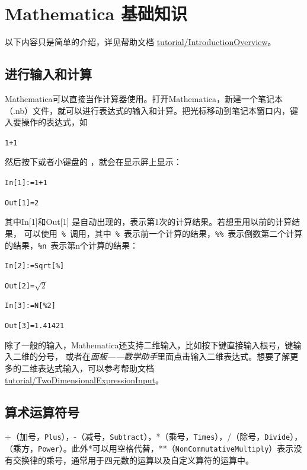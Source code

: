 \documentclass[UTF8,a4paper,10pt]{ctexart}
\begin{document}

\section{Mathematica 基础知识}
以下内容只是简单的介绍，详见帮助文档
\href{http://reference.wolfram.com/language/tutorial/IntroductionOverview.html}{tutorial/IntroductionOverview}。


\subsection{进行输入和计算}

Mathematica可以直接当作计算器使用。打开Mathematica，新建一个笔记本（.nb）文件，就可以进行表达式的输入和计算。把光标移动到笔记本窗口内，键入要操作的表达式，如

\verb|1+1|

然后按下或者小键盘的 ，就会在显示屏上显示：

\verb|In[1]:=1+1|

\verb|Out[1]=2|

其中In[1]和Out[1] 是自动出现的，表示第1次的计算结果。若想重用以前的计算结果，
可以使用~\verb|%|~调用，其中~\verb|%|~表示前一个计算的结果，\verb|%%|~表示倒数第二个计算的结果，\verb|%n|~表示第n个计算的结果：

\verb|In[2]:=Sqrt[%]|

\verb|Out[2]=|$\sqrt{2}$

\verb|In[3]:=N[%2]|

\verb|Out[3]=1.41421|

除了一般的输入，Mathematica还支持二维输入，比如按下键直接输入根号，键输入二维的分号，
或者在\emph{面板——数学助手}里面点击输入二维表达式。想要了解更多的二维表达式输入，可以参考帮助文档\href{http://reference.wolfram.com/language/tutorial/TwoDimensionalExpressionInput.html}{tutorial/TwoDimensionalExpressionInput}。

\subsection{算术运算符号}
+（加号，\verb|Plus|），-（减号，\verb|Subtract|），*（乘号，\verb|Times|），/（除号，\verb|Divide|）， $\hat{}$（乘方，\verb|Power|）。此外*可以用空格代替，**（\verb|NonCommutativeMultiply|）表示没有交换律的乘号，通常用于四元数的运算以及自定义算符的运算中。
\end{document}

